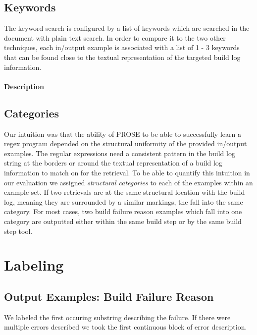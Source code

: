 \documentclass[\myrootdir/main.tex]{subfiles}
\begin{document}
\subsection{Keywords}
The keyword search is configured by a list of keywords which are searched in the document with plain text search.
In order to compare it to the two other techniques, each in/output example is associated with a list of 1 - 3 keywords that can be found close to the textual representation of the targeted build log information.

\paragraph{Description}


\subsection{Categories}
Our intuition was that the ability of PROSE to be able to successfully learn a regex program depended on the structural uniformity of the provided in/output examples.
The regular expressions need a consistent pattern in the build log string at the borders or around the textual representation of a build log information to match on for the retrieval.
To be able to quantify this intuition in our evaluation we assigned \emph{structural categories} to each of the examples within an example set.
If two retrievals are at the same structural location with the build log, meaning they are surrounded by a similar markings, the fall into the same category.
For most cases, two build failure reason examples which fall into one category are outputted either within the same build step or by the same build step tool.

\section{Labeling}
\subsection{Output Examples: Build Failure Reason}
We labeled the first occuring substring describing the failure.
If there were multiple errors described we took the first continuous block of error description.
\end{document}

